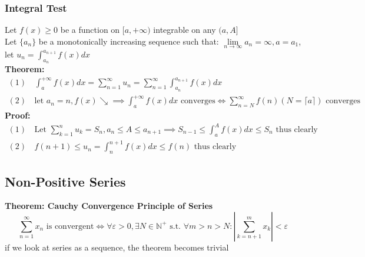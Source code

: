\documentclass{article}
\newcommand{\0}{{\bf{0}}}
\begin{document}
\subsubsection{Integral Test}
Let $f(x)\geq0$ be a function on $[a,+\infty)$ integrable on any $(a,A]$\\
Let $\{a_n\}$ be a monotonically increasing sequence such that: $\lim\limits_{n\to\infty}a_n=\infty,a=a_1$, let $u_n=\displaystyle\int_{a_n}^{a_{n+1}}f(x)dx$\\
\textbf{Theorem:}
\begin{equation}
\begin{split}
    (1)\,&\int_a^{+\infty}f(x)dx=\sum_{n=1}^\infty u_n=\sum_{n=1}^\infty\int_{a_n}^{a_{n+1}}f(x)dx\\
    (2)\,&\mbox{let }a_n=n,f(x)\searrow\implies\int_a^{+\infty}f(x)dx\mbox{ converges}\iff\sum_{n=N}^\infty f(n)(N=\lceil a\rceil)\mbox{ converges}
\end{split}
\end{equation}
\textbf{Proof:}
\begin{equation}
\begin{split}
    (1)\,&\mbox{Let }\sum_{k=1}^nu_k=S_n,a_n\le A\le a_{n+1}\implies S_{n-1}\le\int_a^Af(x)dx\le S_n\mbox{ thus clearly}\\
    (2)\,&f(n+1)\le u_n=\int_n^{n+1}f(x)dx\le f(n)\mbox{ thus clearly}
\end{split}
\end{equation}
\subsection{Non-Positive Series}
\textbf{Theorem: Cauchy Convergence Principle of Series}
$$\sum_{n=1}^\infty x_n\mbox{ is convergent}\iff\forall\varepsilon>0,\exists N\in\mathbb{N}^+\mbox{ s.t. }\forall m>n>N:\left|\sum_{k=n+1}^mx_k\right|<\varepsilon$$
\null\hfill{if we look at series as a sequence, the theorem becomes trivial}
\end{document}
